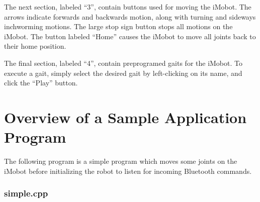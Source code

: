 \documentclass[11pt]{report}
\begin{document}
The next section, labeled ``3'', contain buttons used for moving the iMobot. 
The arrows indicate forwards and backwards motion, along with turning and
sideways inchworming motions. The large stop sign button stops all motions
on the iMobot. The button labeled ``Home'' causes the iMobot to move all joints
back to their home position. 

The final section, labeled ``4'', contain preprogramed gaits for the iMobot.
To execute a gait, simply select the desired gait by left-clicking on its name,
and click the ``Play'' button.

\chapter{Overview of a Sample Application Program}
The following program is a simple program which moves some joints on the iMobot
before initializing the robot to listen for incoming Bluetooth commands.
\subsection{simple.cpp \label{subsec:simple.cpp}}
\end{document}
